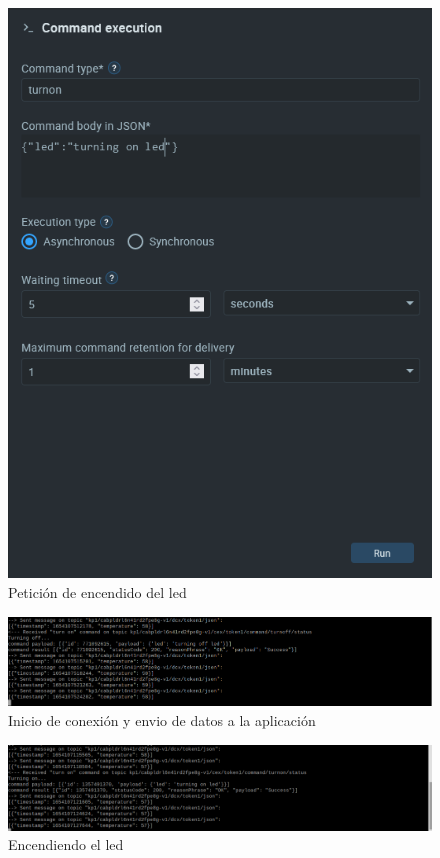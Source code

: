 \begin{figure}[p]
    \centering
    \includegraphics[width=\linewidth]{imagenes/turn-on-led.png}
    \caption{Petición de encendido del led}
    \label{fig:figure15}
\end{figure}

\begin{figure}[p]
    \centering
    \includegraphics[width=\linewidth]{imagenes/2022-06-01-201846_1920x1080_scrot.png}
    \caption{Inicio de conexión y envio de datos a la aplicación}
    \label{fig:figure16}
\end{figure}

\begin{figure}[p]
    \centering
    \includegraphics[width=\linewidth]{imagenes/2022-06-01-201209_1920x1080_scrot.png}
    \caption{Encendiendo el led}
    \label{fig:figure17}
\end{figure}

